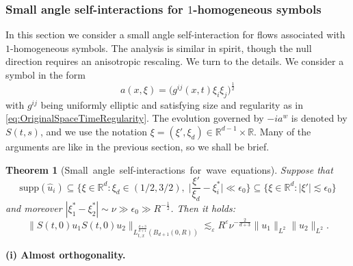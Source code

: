 \documentclass{amsart}
\newtheorem{theorem}{Theorem}[section]
\theoremstyle{definition}
\newcommand{\R}{\mathbb{R}}
\begin{document}
\subsubsection{Small angle self-interactions for $1$-homogeneous symbols}

In this section we consider a small angle self-interaction for flows associated with  $1$-homo\-geneous symbols. The analysis is similar in spirit, though the null direction requires an anisotropic rescaling. We turn to the details. We consider a symbol in the form
\begin{equation*}
a(x,\xi) = \big( g^{ij}(x,t) \xi_i \xi_j \big)^{\frac{1}{2}}
\end{equation*}
with $g^{ij}$ being uniformly elliptic and satisfying size and regularity as in \eqref{eq:OriginalSpaceTimeRegularity}. The evolution governed by $-ia^w$ is denoted by $S(t,s)$, and we use the notation $\xi = (\xi',\xi_d) \in \R^{d-1} \times \R$. Many of the arguments are like in the previous section, so we shall be brief.
\begin{theorem}[Small~angle~self-interactions~for~wave~equations]
\label{thm:BilinearSelfInteractionsWave}
Suppose that 
\begin{equation*}
\text{supp}(\hat{u}_i) \subseteq \{ \xi \in \R^d : \xi_d \in (1/2,3/2), \; \big| \frac{\xi'}{\xi_d} - \xi_i^* \big| \ll \epsilon_0 \} \subseteq \{ \xi \in \R^d : |\xi'| \lesssim \epsilon_0 \}    
\end{equation*}
and moreover $|\xi_1^* - \xi_2^*| \sim \nu \gg \epsilon_0 \gg R^{-\frac{1}{2}}$. Then it holds:
\begin{equation*}
\| S(t,0) u_1 S(t,0) u_2 \|_{L^{\frac{d+3}{d+1}}_{t,x}(B_{d+1}(0,R))} \lesssim_{\varepsilon} R^{\varepsilon} \nu^{-\frac{2}{d+3}} \| u_1 \|_{L^2} \| u_2 \|_{L^2}.
\end{equation*}
\end{theorem}

\textbf{(i) Almost orthogonality.}
\end{document}
